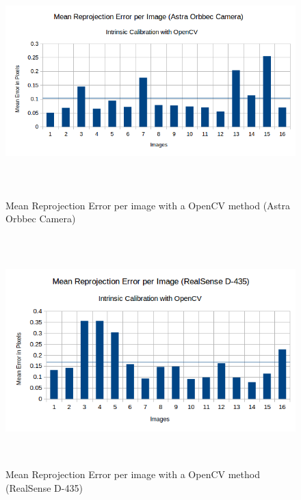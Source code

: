 \begin{figure}[!h]
\begin{center}
\includegraphics[width=5in, height=3.5in]{figures05/opencv_int_cal_astra.png}
\caption{Mean Reprojection Error per image with a OpenCV method (Astra Orbbec Camera)}%
\label{fig:astraopen}
\end{center}
\end{figure}

\begin{figure}[!h]
\begin{center}
\includegraphics[width=5in, height=3.5in]{figures05/opencv_int_cal_real.png}
\caption{Mean Reprojection Error per image with a OpenCV method (RealSense D-435)}%
\label{fig:realopen}
\end{center}
\end{figure}

